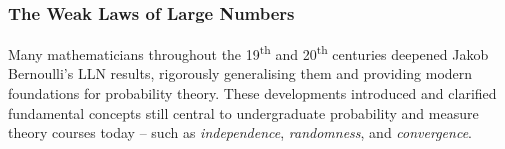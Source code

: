 

\subsubsection{The Weak Laws of Large Numbers}

Many mathematicians throughout the 19\textsuperscript{th} and 20\textsuperscript{th} centuries deepened Jakob Bernoulli’s LLN results, rigorously generalising them and providing modern foundations for probability theory. These developments introduced and clarified fundamental concepts still central to undergraduate probability and measure theory courses today -- such as \textit{independence}, \textit{randomness}, and \textit{convergence}.


